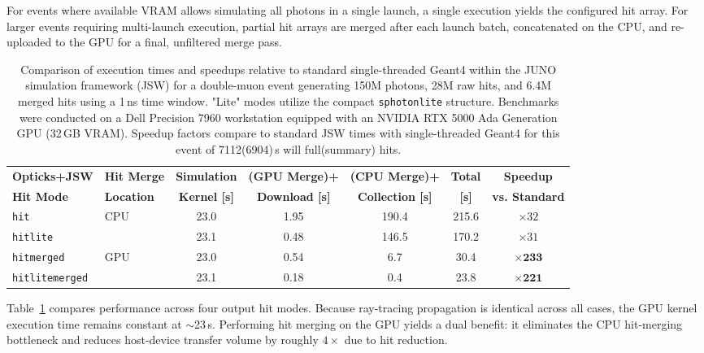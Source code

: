 \documentclass{webofc}
\begin{document}
For events where available VRAM allows simulating all photons in a single launch, a single execution
yields the configured hit array. For larger events requiring multi-launch execution, 
partial hit arrays are merged after each launch batch, concatenated on the CPU, and re-uploaded to the GPU for a final, 
unfiltered merge pass.
%
\begin{table}[htbp]
  \centering
  \small
  \begin{tabular}{llccccc}
    \toprule
    \textbf{Opticks+JSW} & \textbf{Hit Merge} & \textbf{Simulation} & \textbf{(GPU Merge)+} & \textbf{(CPU Merge)+} & \textbf{Total} & \textbf{Speedup} \\
    \textbf{Hit Mode}    & \textbf{Location}  & \textbf{Kernel [s]} & \textbf{Download [s]} & \textbf{Collection [s]} & \textbf{[s]}   & \textbf{vs. Standard} \\
    \midrule
    \texttt{hit}           & \multirow{2}{*}{CPU} & 23.0 & 1.95 & 190.4 & 215.6 & $\times32$ \\
    \texttt{hitlite}       &                      & 23.1 & 0.48 & 146.5 & 170.2 & $\times31$ \\
    \midrule
    \texttt{hitmerged}     & \multirow{2}{*}{GPU} & 23.0 & 0.54 & 6.7   & 30.4  & $\mathbf{\times233}$ \\
    \texttt{hitlitemerged} &                      & 23.1 & 0.18 & 0.4   & 23.8  & $\mathbf{\times221}$ \\
    \bottomrule
  \end{tabular}
  \caption{%
Comparison of execution times and speedups relative to standard single-threaded
Geant4 within the JUNO simulation framework (JSW) for a double-muon event
generating 150M photons, 28M raw hits, and 6.4M merged hits using a 1\,ns time
window. "Lite" modes utilize the compact \texttt{sphotonlite} structure.
Benchmarks were conducted on a Dell Precision 7960 workstation equipped with an
NVIDIA RTX 5000 Ada Generation GPU (32\,GB VRAM). Speedup factors compare to
standard JSW times with single-threaded Geant4 for this event of 7112(6904)\,s
will full(summary) hits.%
}
  \label{tab:opticks_junosw_performance}
\end{table}
%

%
Table~\ref{tab:opticks_junosw_performance} compares performance across four
output hit modes. Because ray-tracing propagation is identical across all
cases, the GPU kernel execution time remains constant at $\sim$23\,s. 
Performing hit merging on the GPU yields a dual benefit: it eliminates the
CPU hit-merging bottleneck and reduces host-device transfer
volume by roughly $4\times$ due to hit reduction. 
\end{document}
